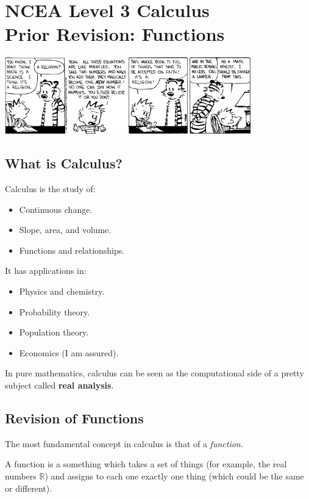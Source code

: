 


\section*{NCEA Level 3 Calculus\\Prior Revision: Functions}
\begin{center}
  \includegraphics[width=0.8\textwidth]{hobbes}
\end{center}
\subsection* {What is Calculus?}
Calculus is the study of:
\begin{itemize}
  \item Continuous change.
  \item Slope, area, and volume.
  \item Functions and relationships.
\end{itemize}

It has applications in:
\begin{itemize}
  \item Physics and chemistry.
  \item Probability theory.
  \item Population theory.
  \item Economics (I am assured).
\end{itemize}

In pure mathematics, calculus can be seen as the computational side of a pretty
subject called \textbf{real analysis}.

\subsection*{Revision of Functions}
The most fundamental concept in calculus is that of a \textit{function}.

\begin{defn}[Function]
  A function is a something which takes a set of things (for example, the real numbers $ \mathbb{R} $) and assigns
  to each one exactly one thing (which could be the same or different).
\end{defn}

